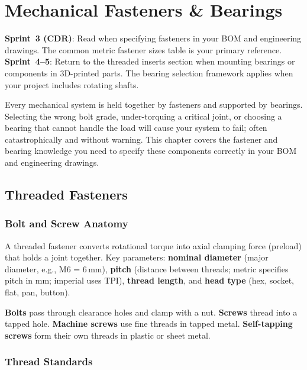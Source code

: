 \chapter{Mechanical Fasteners \& Bearings}\label{ch:fasteners}

\begin{tipbox}
\textbf{Sprint~3 (CDR)}: Read when specifying fasteners in your BOM and engineering drawings. The common metric fastener sizes table is your primary reference. \textbf{Sprint~4--5}: Return to the threaded inserts section when mounting bearings or components in 3D-printed parts. The bearing selection framework applies when your project includes rotating shafts.
\end{tipbox}


\vspace{1em}

Every mechanical system is held together by fasteners and supported by bearings. Selecting the wrong bolt grade, under-torquing a critical joint, or choosing a bearing that cannot handle the load will cause your system to fail; often catastrophically and without warning. This chapter covers the fastener and bearing knowledge you need to specify these components correctly in your BOM and engineering drawings.

\vspace{1em}

\section{Threaded Fasteners}

\subsection{Bolt and Screw Anatomy}
A threaded fastener converts rotational torque into axial clamping force (preload) that holds a joint together. Key parameters: \textbf{nominal diameter} (major diameter, e.g., M6 = 6\,mm), \textbf{pitch} (distance between threads; metric specifies pitch in mm; imperial uses TPI), \textbf{thread length}, and \textbf{head type} (hex, socket, flat, pan, button).

\textbf{Bolts} pass through clearance holes and clamp with a nut. \textbf{Screws} thread into a tapped hole. \textbf{Machine screws} use fine threads in tapped metal. \textbf{Self-tapping screws} form their own threads in plastic or sheet metal.

\subsection{Thread Standards}


